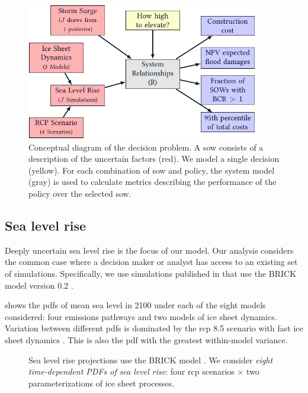 \documentclass[12pt]{article}
\begin{document}
\begin{figure}
    \centering
    \includegraphics[width=4in]{xlrm.pdf}
    \caption{
        Conceptual diagram of the decision problem.
        A \gls{sow} consists of a description of the uncertain factors (red).
        We model a single decision (yellow).
        For each combination of \gls{sow} and policy, the system model (gray) is used to calculate metrics describing the performance of the policy over the selected \gls{sow}.
    }\label{fig:xlrm}
\end{figure}

\subsection{Sea level rise}\label{sec:sea-level}

Deeply uncertain sea level rise is the focus of our model.
Our analysis considers the common case where a decision maker or analyst has access to an existing set of simulations.
Specifically, we use simulations published in \citet{ruckart_hazardous:2008} that use the BRICK model version 0.2 \citep{wong_brick0.2:2017}.

 shows the \glspl{pdf} of mean sea level in 2100 under each of the eight models considered: four emissions pathways \citep[\gls{rcp} scenarios][]{moss_rcp:2010} and two models of ice sheet dynamics.
Variation between different \glspl{pdf} is dominated by the \gls{rcp} 8.5 scenario with fast ice sheet dynamics \citep[see][for a discussion of these dynamics]{wong_brick0.2:2017}.
This is also the \gls{pdf} with the greatest within-model variance.
\begin{figure}
    \centering
    \caption{
        Sea level rise projections use the BRICK model \citep{wong_brick0.2:2017,ruckert_coastal:2019}.
        We consider \emph{eight time-dependent PDFs of sea level rise}: four \gls{rcp} scenarios $\times$ two parameterizations of ice sheet processes.
    }\label{fig:msl-boxplots}
\end{figure}
\end{document}
